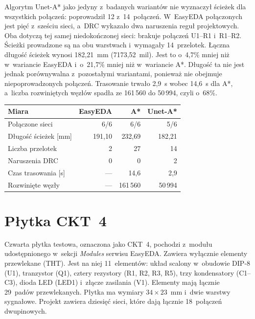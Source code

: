 Algorytm Unet-A* jako jedyny z~badanych wariantów nie wyznaczył ścieżek
dla wszystkich połączeń: poprowadził 12 z~14~połączeń. W~EasyEDA
połączonych jest pięć z~sześciu sieci, a~DRC wykazało dwa naruszenia
reguł projektowych. Oba dotyczą tej samej niedokończonej sieci:
brakuje połączeń U1--R1 i~R1--R2. Ścieżki prowadzone są na obu
warstwach i~wymagały 14~przelotek. Łączna długość ścieżek wynosi
182,21~mm (7173,52~mil). Jest to o~4,7\% mniej niż w~wariancie EasyEDA
i~o~21,7\% mniej niż w~wariancie A*. Długość ta nie jest jednak
porównywalna z~pozostałymi wariantami, ponieważ nie obejmuje
niepoprowadzonych połączeń. Trasowanie trwało 2,9~s wobec 14,6~s dla A*,
a~liczba rozwiniętych węzłów spadła ze 161\,560 do 50\,994, czyli
o~68\%.

\begin{table}[ht]
\label{tab:wyniki-pt4115}
\centering\footnotesize%
\begin{tabular}{l r r r}
\toprule
Miara & EasyEDA & A* & Unet-A* \\
\midrule
Połączone sieci & 6/6 & 6/6 & 5/6 \\
\midrule
Długość ścieżek [mm] & 191,10 & 232,69 & 182,21 \\
\midrule
Liczba przelotek & 2 & 27 & 14 \\
\midrule
Naruszenia DRC & 0 & 0 & 2 \\
\midrule
Czas trasowania [s] & --- & 14,6 & 2,9 \\
\midrule
Rozwinięte węzły & --- & 161\,560 & 50\,994 \\
\bottomrule
\end{tabular}
\end{table}

\section{Płytka CKT~4}
\label{sec:wyniki-ckt4}

Czwarta płytka testowa, oznaczona jako CKT~4, pochodzi z~modułu
udostępnionego w~sekcji \emph{Modules} serwisu
EasyEDA. Zawiera wyłącznie elementy przewlekane
(THT). Jest na niej 11~elementów: układ scalony w~obudowie
DIP-8 (U1), tranzystor (Q1), cztery rezystory (R1, R2, R3, R5), trzy
kondensatory (C1--C3), dioda LED (LED1) i~złącze zasilania (V1). Elementy
mają łącznie 29~padów przewlekanych. Płytka ma wymiary $34 \times 23$~mm
i~dwie warstwy sygnałowe. Projekt zawiera dziesięć sieci, które dają
łącznie 18~połączeń dwupinowych.

